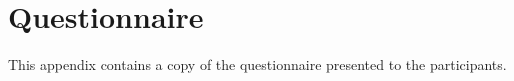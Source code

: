 \chapter{Questionnaire}
\label{questionnaire}
This appendix contains a copy of the questionnaire presented to the participants. 
